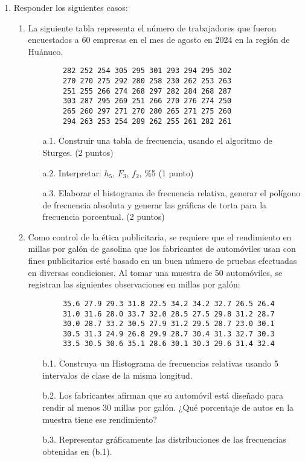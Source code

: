 \documentclass{article}
\begin{document}
\begin{enumerate}
    \item Responder los siguientes casos:
    \begin{enumerate}
        \item La siguiente tabla representa el número de trabajadores que fueron encuestados a 60 empresas en el mes de agosto en 2024 en la región de Huánuco.
        
        \begin{verbatim}
        282 252 254 305 295 301 293 294 295 302
        270 270 275 292 280 258 230 262 253 263
        251 255 266 274 268 297 282 284 268 287
        303 287 295 269 251 266 270 276 274 250
        265 260 297 271 270 280 265 271 275 260
        294 263 253 254 289 262 255 261 282 261
        \end{verbatim}
        
        \begin{itemize}
            \item[a.1.] Construir una tabla de frecuencia, usando el algoritmo de Sturges. (2 puntos)
            \item[a.2.] Interpretar: $h_5$, $F_3$, $f_2$, \%5 (1 punto)
            \item[a.3.] Elaborar el histograma de frecuencia relativa, generar el polígono de frecuencia absoluta y generar las gráficas de torta para la frecuencia porcentual. (2 puntos)
        \end{itemize}
        
        \item Como control de la ética publicitaria, se requiere que el rendimiento en millas por galón de gasolina que los fabricantes de automóviles usan con fines publicitarios esté basado en un buen número de pruebas efectuadas en diversas condiciones. Al tomar una muestra de 50 automóviles, se registran las siguientes observaciones en millas por galón:
        
        \begin{verbatim}
        35.6 27.9 29.3 31.8 22.5 34.2 34.2 32.7 26.5 26.4
        31.0 31.6 28.0 33.7 32.0 28.5 27.5 29.8 31.2 28.7
        30.0 28.7 33.2 30.5 27.9 31.2 29.5 28.7 23.0 30.1
        30.5 31.3 24.9 26.8 29.9 28.7 30.4 31.3 32.7 30.3
        33.5 30.5 30.6 35.1 28.6 30.1 30.3 29.6 31.4 32.4
        \end{verbatim}
        
        \begin{itemize}
            \item[b.1.] Construya un Histograma de frecuencias relativas usando 5 intervalos de clase de la misma longitud.
            \item[b.2.] Los fabricantes afirman que su automóvil está diseñado para rendir al menos 30 millas por galón. ¿Qué porcentaje de autos en la muestra tiene ese rendimiento?
            \item[b.3.] Representar gráficamente las distribuciones de las frecuencias obtenidas en (b.1).
        \end{itemize}
    \end{enumerate}
\end{enumerate}
\end{document}
